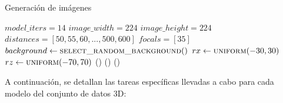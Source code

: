 \begin{algorithm}
	\caption{Generación de imágenes}\label{alg:render_images}
	\begin{algorithmic}[1]
	\State $model\_iters = 14$
	\State $image\_width = 224$
	\State $image\_height = 224$
	\State $distances = [50, 55, 60, ..., 500, 600]$
	\State $focals = [35]$
		\State {}
			\State {}
				\State {}
					\State $background \gets \Call{select\_random\_background}{}() $
					\State {}
					\State $rx \gets \Call{uniform}{-30, 30}$ %
					\State $rz \gets \Call{uniform}{-70,70}$
					\State {}
					\State {}()
					\State {}()
					\State {}()
				\EndFor
			\EndFor
		\EndFor
	\EndFor
	\end{algorithmic}
\end{algorithm}

A continuación, se detallan las tareas específicas llevadas a cabo para cada modelo del conjunto de datos 3D:

\renewcommand{\theenumii}{\arabic{enumii}}

